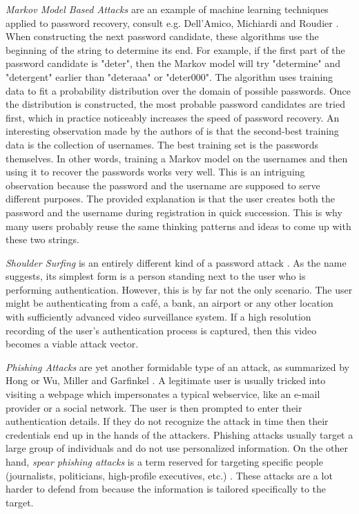 \emph{Markov Model Based Attacks} are an example of machine learning techniques applied to password recovery, consult e.g. Dell’Amico, Michiardi and Roudier \cite{dell:2010:password}. When constructing the next password candidate, these algorithms use the beginning of the string to determine its end. For example, if the first part of the password candidate is "deter", then the Markov model will try "determine" and "detergent" earlier than "deteraaa" or "deter000". The algorithm uses training data to fit a probability distribution over the domain of possible passwords. Once the distribution is constructed, the most probable password candidates are tried first, which in practice noticeably increases the speed of password recovery. An interesting observation made by the authors of \cite{dell:2010:password} is that the second-best training data is the collection of usernames. The best training set is the passwords themselves. In other words, training a Markov model on the usernames and then using it to recover the passwords works very well. This is an intriguing observation because the password and the username are supposed to serve different purposes. The provided explanation is that the user creates both the password and the username during registration in quick succession. This is why many users probably reuse the same thinking patterns and ideas to come up with these two strings.

\emph{Shoulder Surfing} is an entirely different kind of a password attack \cite{raza:2012:password-attacks-survey, suo:2005:graphical-passwords-survey} . As the name suggests, its simplest form is a person standing next to the user who is performing authentication. However, this is by far not the only scenario. The user might be authenticating from a café, a bank, an airport or any other location with sufficiently advanced video surveillance system. If a high resolution recording of the user's authentication process is captured, then this video becomes a viable attack vector.

\emph{Phishing Attacks} are yet another formidable type of an attack, as summarized by Hong \cite{hong:2012:state} or Wu, Miller and Garfinkel \cite{Wu:2006:STA:1124772.1124863}. A legitimate user is usually tricked into visiting a webpage which impersonates a typical webservice, like an e-mail provider or a social network. The user is then prompted to enter their authentication details. If they do not recognize the attack in time then their credentials end up in the hands of the attackers. Phishing attacks usually target a large group of individuals and do not use personalized information. On the other hand, \emph{spear phishing attacks} is a term reserved for targeting specific people (journalists, politicians, high-profile executives, etc.) \cite{hong:2012:state}. These attacks are a lot harder to defend from because the information is tailored specifically to the target.

